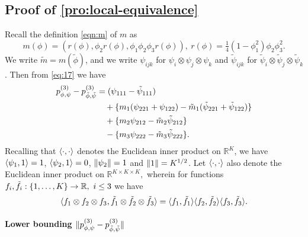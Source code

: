 \documentclass[journal]{IEEEtran}
\newcommand{\1}{\boldsymbol{1}}
\DeclarePairedDelimiter{\Inner}{\langle}{\rangle}
\DeclarePairedDelimiter{\braces}{\{}{\}}
\DeclarePairedDelimiter{\ip}{\langle}{\rangle}
\DeclarePairedDelimiter{\norm}{\lVert}{\rVert}
\newcommand{\RR}{\mathbb{R}}
\begin{document}
\subsection{Proof of \cref{pro:local-equivalence}}
Recall the definition \eqref{eqn:m} of $m$ as
\begin{equation*}
  m(\phi)=(r(\phi),\phi_2 r(\phi), \phi_1 \phi_2 \phi_3 r(\phi) ),\ %
  r(\phi)=\tfrac{1}{4}(1-\phi_1^2)\phi_2\phi_3^2.
\end{equation*}
We write $\tilde{m}=m(\tilde{\phi})$, and we write $\psi_{ijk}$ for $\psi_i\otimes \psi_j\otimes \psi_k$ and $\tilde{\psi}_{ijk}$ for $\tilde{\psi}_i\otimes \tilde{\psi}_j \otimes \tilde{\psi}_k$. Then from \cref{eq:17} we have
\begin{equation}
  \label{eq:24}
  \begin{aligned}
    p_{\phi,\psi}^{(3)} - p_{\tilde{\phi},\tilde{\psi}}^{(3)}%
    &= (\psi_{111} - \tilde{\psi}_{111})\\%
    &\quad%
      + \braces{m_1(\psi_{221} + \psi_{122}) - \tilde{m}_1(\tilde{\psi}_{221} +
			\tilde{\psi}_{122})}\\%
    &\quad%
      + \braces{m_2\psi_{212} -
      \tilde{m}_2\tilde{\psi}_{212}}\\%
    &\quad%
      - \braces{m_3\psi_{222} - \tilde{m}_3\tilde{\psi}_{222} }.
  \end{aligned}
\end{equation}
Recalling that $\Inner{\cdot,\cdot}$ denotes the Euclidean inner product on $\RR^K$, we have $\ip{\psi_1,1} = 1$, $\Inner{\psi_2,1} = 0$,
$\norm{\psi_2}=1$ and $\norm{1}= K^{1/2}$. Let $\Inner{\cdot,\cdot}$ also denote the Euclidean inner product on $\RR^{K \times K \times K},$ wherein for functions $f_i,\tilde{f}_i:\braces{1,\dots,K}\to \RR,~i\leq 3$ we have
\[ \ip{f_1\otimes f_2\otimes f_3,\tilde{f}_1\otimes \tilde{f}_2\otimes \tilde{f}_3} = \ip{f_1,\tilde{f}_1}\ip{f_2,\tilde{f}_2}\ip{f_3,\tilde{f}_3}.\]
\paragraph{Lower bounding $\norm{p^{(3)}_{\phi,\psi}-p^{(3)}_{\tilde{\phi},\tilde{\psi}}}$}
\end{document}
